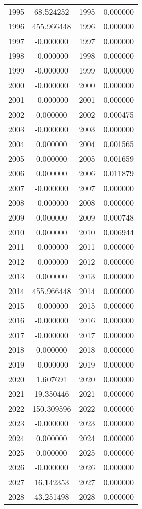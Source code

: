 \documentclass[12pt]{article}
\begin{document}
\begin{longtable}{@{}cccc@{}}
1995 & 68.524252 & 1995 & 0.000000 \\
1996 & 455.966448 & 1996 & 0.000000 \\
1997 & -0.000000 & 1997 & 0.000000 \\
1998 & -0.000000 & 1998 & 0.000000 \\
1999 & -0.000000 & 1999 & 0.000000 \\
2000 & -0.000000 & 2000 & 0.000000 \\
2001 & -0.000000 & 2001 & 0.000000 \\
2002 & 0.000000 & 2002 & 0.000475 \\
2003 & -0.000000 & 2003 & 0.000000 \\
2004 & 0.000000 & 2004 & 0.001565 \\
2005 & 0.000000 & 2005 & 0.001659 \\
2006 & 0.000000 & 2006 & 0.011879 \\
2007 & -0.000000 & 2007 & 0.000000 \\
2008 & -0.000000 & 2008 & 0.000000 \\
2009 & 0.000000 & 2009 & 0.000748 \\
2010 & 0.000000 & 2010 & 0.006944 \\
2011 & -0.000000 & 2011 & 0.000000 \\
2012 & -0.000000 & 2012 & 0.000000 \\
2013 & 0.000000 & 2013 & 0.000000 \\
2014 & 455.966448 & 2014 & 0.000000 \\
2015 & -0.000000 & 2015 & 0.000000 \\
2016 & -0.000000 & 2016 & 0.000000 \\
2017 & -0.000000 & 2017 & 0.000000 \\
2018 & 0.000000 & 2018 & 0.000000 \\
2019 & -0.000000 & 2019 & 0.000000 \\
2020 & 1.607691 & 2020 & 0.000000 \\
2021 & 19.350446 & 2021 & 0.000000 \\
2022 & 150.309596 & 2022 & 0.000000 \\
2023 & -0.000000 & 2023 & 0.000000 \\
2024 & 0.000000 & 2024 & 0.000000 \\
2025 & 0.000000 & 2025 & 0.000000 \\
2026 & -0.000000 & 2026 & 0.000000 \\
2027 & 16.142353 & 2027 & 0.000000 \\
2028 & 43.251498 & 2028 & 0.000000 \\

\end{longtable}
\end{document}
